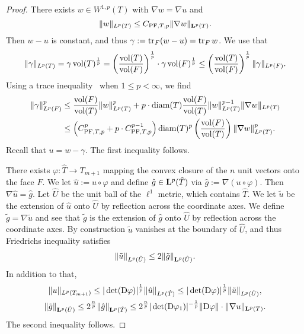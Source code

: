 \documentclass[a4paper]{article}
\begin{document}
\begin{proof}
    There exists $w \in W^{1,p}(T)$ with $\nabla w = \nabla u$ and 
    \[
        \| w \|_{L^{p}(T)}
        \leq 
        C_{{\rm PF},T,p} 
        \| \nabla w \|_{{\mathbf L}^{p}(T)}
        .
    \]
    Then $w-u$ is constant, and thus $\gamma := \operatorname{tr}_{F} (w-u) = \operatorname{tr}_{F} w$. 
    We use that 
    \[
        \| \gamma \|_{L^{p}(T)}
        =
        \gamma \operatorname{vol}(T)^\frac{1}{p}
        =
        \left( \frac{ \operatorname{vol}(T) }{ \operatorname{vol}(F) } \right)^\frac{1}{p}
        \cdot 
        \gamma 
        \operatorname{vol}(F)^\frac{1}{p}
        \leq 
        \left( \frac{ \operatorname{vol}(T) }{ \operatorname{vol}(F) } \right)^\frac{1}{p}
        \| \gamma \|_{L^{p}(F)}
        .
    \]
    Using a trace inequality~\cite[Lemma~2.8]{veeser2012poincare} when $1 \leq p < \infty$, we find 
    \begin{align*}
        \| \gamma \|_{L^{p}(F)}^{p}
        &
        \leq 
        \frac{ \operatorname{vol}(F) }{ \operatorname{vol}(T) }
        \| w \|_{L^{p}(T)}^{p}
        +
        p
        \cdot 
        {\operatorname{diam}}(T)
        \frac{ \operatorname{vol}(F) }{ \operatorname{vol}(T) }
        \| w \|_{L^{p}(T)}^{p-1}
        \| \nabla w \|_{L^{p}(T)}
        \\&
        \leq 
        \left( C_{{\rm PF},T,p}^{p} + p \cdot C_{{\rm PF},T,p}^{p-1} \right) 
        {\operatorname{diam}}(T)^{p}
        \left( \frac{ \operatorname{vol}(F) }{ \operatorname{vol}(T) } \right)
        \| \nabla w \|_{L^{p}(T)}^{p}
        .
    \end{align*}
    Recall that $u = w - \gamma$. The first inequality follows. 
    
    There exists $\varphi : \hat T \rightarrow T_{m+1}$ mapping the convex closure of the $n$ unit vectors onto the face $F$.
    We let $\hat u := u \circ \varphi$ and define $\hat g \in {\mathbf L}^p(\hat T)$ via $\hat g := \nabla ( u \circ \varphi )$. 
    Then $\nabla \hat u = \hat g$. 
    Let $\hat U$ be the unit ball of the $\ell^1$ metric, which contains $\hat T$.
    We let $\tilde u$ be the extension of $\hat u$ onto $\hat U$ by reflection across the coordinate axes.
    We define $\tilde g = \nabla \tilde u$
    and see that $\tilde g$ is the extension of $\hat g$ onto $\hat U$ by reflection across the coordinate axes. 
    By construction $\tilde u$ vanishes at the boundary of $\hat U$, and thus Friedrichs inequality satisfies 
    \begin{gather*}
        \| \tilde u \|_{L^{p}(\hat U)} 
        \leq 
        2 
        \| \tilde g \|_{{\mathbf L}^{p}(\hat U)}
        .
    \end{gather*}
    In addition to that, 
    \begin{gather*}
        \| u \|_{L^{p}(T_{m+1})}
        \leq 
        |\det({\mathrm D} \varphi)|^{\frac 1 p} 
        \| \hat u \|_{L^{p}(\hat T)}
        \leq 
        |\det({\mathrm D} \varphi)|^{\frac 1 p} 
        \| \tilde u \|_{L^{p}(\hat U)}
        ,
        \\
        \| \tilde g \|_{{\mathbf L}^{p}(\hat U)}
        \leq 
        2^{\frac n p}
        \| \hat g \|_{{\mathbf L}^{p}(\hat T)}
        \leq 
        2^{\frac n p}
        |\det({\mathrm D} \varphi_1)|^{-\frac 1 p} \| {\mathrm D} \varphi \| \cdot 
        \| \nabla u \|_{{\mathbf L}^{p}(T)}
        .
    \end{gather*}
    The second inequality follows.
\end{proof}
\end{document}
